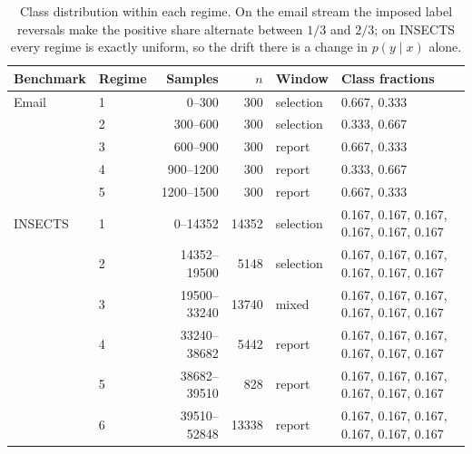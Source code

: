 \begin{table}[htbp]
\centering
\footnotesize
\setlength{\tabcolsep}{3pt}
\caption{Class distribution within each regime. On the email stream the imposed label reversals make the positive share alternate between $1/3$ and $2/3$; on INSECTS every regime is exactly uniform, so the drift there is a change in $p(y \mid x)$ alone.}
\label{tab:s4b_class_distribution}
\begin{tabular}{@{}llrrll@{}}
\toprule
Benchmark & Regime & Samples & $n$ & Window & Class fractions \\
\midrule
Email & 1 & 0--300 & 300 & selection & 0.667, 0.333 \\
 & 2 & 300--600 & 300 & selection & 0.333, 0.667 \\
 & 3 & 600--900 & 300 & report & 0.667, 0.333 \\
 & 4 & 900--1200 & 300 & report & 0.333, 0.667 \\
 & 5 & 1200--1500 & 300 & report & 0.667, 0.333 \\
\midrule
INSECTS & 1 & 0--14352 & 14352 & selection & 0.167, 0.167, 0.167, 0.167, 0.167, 0.167 \\
 & 2 & 14352--19500 & 5148 & selection & 0.167, 0.167, 0.167, 0.167, 0.167, 0.167 \\
 & 3 & 19500--33240 & 13740 & mixed & 0.167, 0.167, 0.167, 0.167, 0.167, 0.167 \\
 & 4 & 33240--38682 & 5442 & report & 0.167, 0.167, 0.167, 0.167, 0.167, 0.167 \\
 & 5 & 38682--39510 & 828 & report & 0.167, 0.167, 0.167, 0.167, 0.167, 0.167 \\
 & 6 & 39510--52848 & 13338 & report & 0.167, 0.167, 0.167, 0.167, 0.167, 0.167 \\
\bottomrule
\end{tabular}
\end{table}
